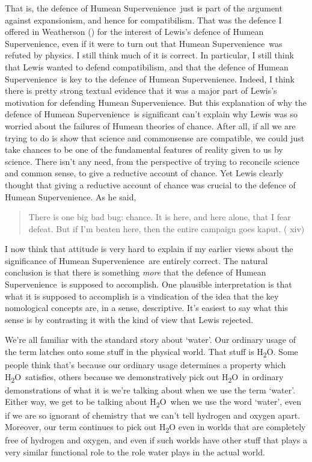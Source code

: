 \documentclass[
  10pt,
  letterpaper,
  DIV=11,
  numbers=noendperiod,
  twoside]{scrartcl}
\begin{document}
That is, the defence of Humean Supervenience~just is part of the
argument against expansionism, and hence for compatibilism. That was the
defence I offered in Weatherson
() for the interest of Lewis's
defence of Humean Supervenience, even if it were to turn out that Humean
Supervenience~was refuted by physics. I still think much of it is
correct. In particular, I still think that Lewis wanted to defend
compatibilism, and that the defence of Humean Supervenience~is key to
the defence of Humean Supervenience. Indeed, I think there is pretty
strong textual evidence that it was a major part of Lewis's motivation
for defending Humean Supervenience. But this explanation of why the
defence of Humean Supervenience~is significant can't explain why Lewis
was so worried about the failures of Humean theories of chance. After
all, if all we are trying to do is show that science and commonsense are
compatible, we could just take chances to be one of the fundamental
features of reality given to us by science. There isn't any need, from
the perspective of trying to reconcile science and common sense, to give
a reductive account of chance. Yet Lewis clearly thought that giving a
reductive account of chance was crucial to the defence of Humean
Supervenience. As he said,

\begin{quote}
There is one big bad bug: chance. It is here, and here alone, that I
fear defeat. But if I'm beaten here, then the entire campaign goes
kaput. ( xiv)
\end{quote}

I now think that attitude is very hard to explain if my earlier views
about the significance of Humean Supervenience~are entirely correct. The
natural conclusion is that there is something \emph{more} that the
defence of Humean Supervenience~is supposed to accomplish. One plausible
interpretation is that what it is supposed to accomplish is a
vindication of the idea that the key nomological concepts are, in a
sense, descriptive. It's easiest to say what this sense is by
contrasting it with the kind of view that Lewis rejected.

We're all familiar with the standard story about `water'. Our ordinary
usage of the term latches onto some stuff in the physical world. That
stuff is H\textsubscript{2}O. Some people think that's because our
ordinary usage determines a property which
H\textsubscript{2}O~satisfies, others because we demonstratively pick
out H\textsubscript{2}O~in ordinary demonstrations of what it is we're
talking about when we use the term `water'. Either way, we get to be
talking about H\textsubscript{2}O~when we use the word `water', even if
we are so ignorant of chemistry that we can't tell hydrogen and oxygen
apart. Moreover, our term continues to pick out H\textsubscript{2}O even
in worlds that are completely free of hydrogen and oxygen, and even if
such worlds have other stuff that plays a very similar functional role
to the role water plays in the actual world.
\end{document}
